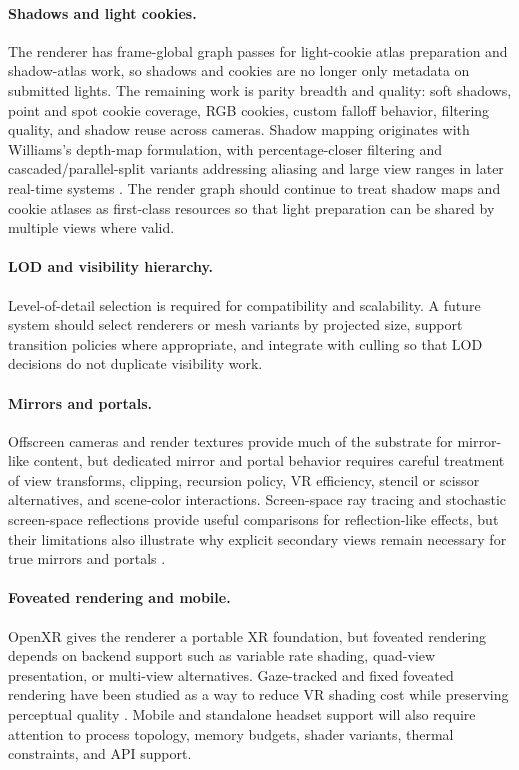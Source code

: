 \documentclass[acmtog,screen,nonacm]{acmart}
\begin{document}
\paragraph{Shadows and light cookies.}
The renderer has frame-global graph passes for light-cookie atlas preparation and shadow-atlas work, so shadows and cookies are no longer only metadata on submitted lights. The remaining work is parity breadth and quality: soft shadows, point and spot cookie coverage, RGB cookies, custom falloff behavior, filtering quality, and shadow reuse across cameras. Shadow mapping originates with Williams's depth-map formulation, with percentage-closer filtering and cascaded/parallel-split variants addressing aliasing and large view ranges in later real-time systems \citep{williams1978shadowMaps,reeves1987pcf,zhang2007pssm}. The render graph should continue to treat shadow maps and cookie atlases as first-class resources so that light preparation can be shared by multiple views where valid.

\paragraph{LOD and visibility hierarchy.}
Level-of-detail selection is required for compatibility and scalability. A future system should select renderers or mesh variants by projected size, support transition policies where appropriate, and integrate with culling so that LOD decisions do not duplicate visibility work.

\paragraph{Mirrors and portals.}
Offscreen cameras and render textures provide much of the substrate for mirror-like content, but dedicated mirror and portal behavior requires careful treatment of view transforms, clipping, recursion policy, VR efficiency, stencil or scissor alternatives, and scene-color interactions. Screen-space ray tracing and stochastic screen-space reflections provide useful comparisons for reflection-like effects, but their limitations also illustrate why explicit secondary views remain necessary for true mirrors and portals \citep{mcguireMara2014ssrt,stachowiak2015sssr}.

\paragraph{Foveated rendering and mobile.}
OpenXR gives the renderer a portable XR foundation, but foveated rendering depends on backend support such as variable rate shading, quad-view presentation, or multi-view alternatives. Gaze-tracked and fixed foveated rendering have been studied as a way to reduce VR shading cost while preserving perceptual quality \citep{patney2016foveated,armFoveatedRendering}. Mobile and standalone headset support will also require attention to process topology, memory budgets, shader variants, thermal constraints, and API support.
\end{document}
